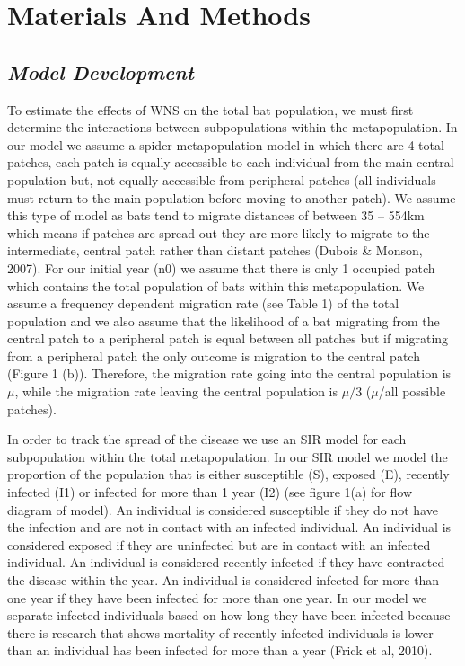 \documentclass[12pt]{article}
\begin{document}
\section*{\centering \sc \large Materials And Methods}

\subsection*{\sc \textit{Model Development}}

To estimate the effects of WNS on the total bat population, we must first determine the interactions between subpopulations within the metapopulation. In our model we assume a spider metapopulation model in which there are 4 total patches, each patch is equally accessible to each individual from the main central population but, not equally accessible from peripheral patches (all individuals must return to the main population before moving to another patch). We assume this type of model as bats tend to migrate distances of between 35 – 554km which means if patches are spread out they are more likely to migrate to the intermediate, central patch rather than distant patches (Dubois \& Monson, 2007). For our initial year (n0) we assume that there is only 1 occupied patch which contains the total population of bats within this metapopulation. We assume a frequency dependent migration rate (see Table 1) of the total population and we also assume that the likelihood of a bat migrating from the central patch to a peripheral patch is equal between all patches but if migrating from a peripheral patch the only outcome is migration to the central patch (Figure 1 (b)). Therefore, the migration rate going into the central population is $\mu$, while the migration rate leaving the central population is $\mu/3$ ($\mu$/all possible patches).

In order to track the spread of the disease we use an SIR model for each subpopulation within the total metapopulation. In our SIR model we model the proportion of the population that is either susceptible (S), exposed (E), recently infected (I1) or infected for more than 1 year (I2) (see figure 1(a) for flow diagram of model). An individual is considered susceptible if they do not have the infection and are not in contact with an infected individual. An individual is considered exposed if they are uninfected but are in contact with an infected individual. An individual is considered recently infected if they have contracted the disease within the year. An individual is considered infected for more than one year if they have been infected for more than one year. In our model we separate infected individuals based on how long they have been infected because there is research that shows mortality of recently infected individuals is lower than an individual has been infected for more than a year (Frick et al, 2010).
\end{document}
